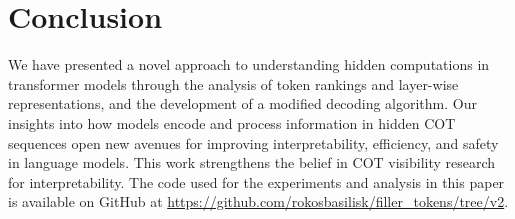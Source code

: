 \documentclass[10pt,a4paper]{article}
\begin{document}
\section{Conclusion}
We have presented a novel approach to understanding hidden computations in transformer models through the analysis of token rankings and layer-wise representations, and the development of a modified decoding algorithm. Our insights into how models encode and process information in hidden COT sequences open new avenues for improving interpretability, efficiency, and safety in language models. This work strengthens the belief in COT visibility research for interpretability.
\vfill
The code used for the experiments and analysis in this paper is available on GitHub at \href{https://github.com/rokosbasilisk/filler_tokens/tree/v2}{https://github.com/rokosbasilisk/filler\_tokens/tree/v2}.
\clearpage
\end{document}
